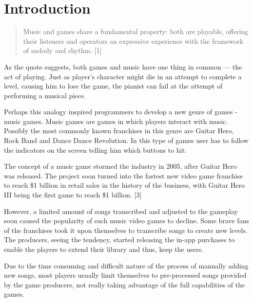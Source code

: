 
\chapter{Introduction} %

\label{Chapter1} %



\begin{quotation}
Music and games share a fundamental property: both are playable, offering their listeners and operators an expressive experience with the framework of melody and rhythm. [1]
\end{quotation} 

As the quote suggests, both games and music have one thing in common — the act of playing. Just as player’s character might die in an attempt to complete a level, causing him to lose the game, the pianist can fail at the attempt of performing a musical piece. 

Perhaps this analogy inspired programmers to develop a new genre of games - music games. Music games are games in which players interact with music. Possibly the most commonly known franchises in this genre are Guitar Hero, Rock Band and Dance Dance Revolution. In this type of games user has to follow the indicators on the screen telling him which buttons to hit. 

The concept of a music game stormed the industry in 2005, after Guitar Hero was released. The project soon turned into the fastest new video game franchise to reach \$1 billion in retail sales in the history of the business, with Guitar Hero III being the first game to reach \$1 billion. [3]

However, a limited amount of songs transcribed and adjusted to the gameplay soon caused the popularity of such music video games to decline. Some brave fans of the franchises took it upon themselves to transcribe songs to create new levels. The producers, seeing the tendency, started releasing the in-app purchases to enable the players to extend their library and thus, keep the users. 

Due to the time consuming and difficult nature of the process of manually adding new songs, most players usually limit themselves to pre-processed songs provided by the game producers, not really taking advantage of the full capabilities of the games. 

